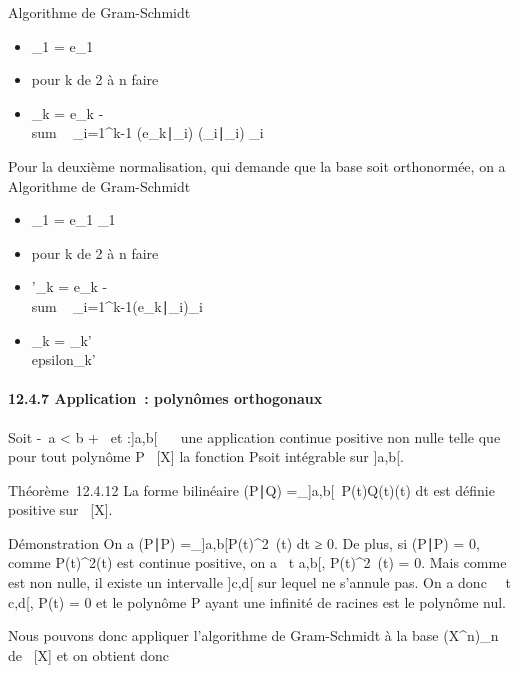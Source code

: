 \documentclass[]{article}
\begin{document}
Algorithme de Gram-Schmidt

\begin{itemize}
\itemsep1pt\parskip0pt
\item
  \epsilon_1 = e_1
\item
  pour k de 2 à n faire
\item
  \quad \quad \epsilon_k = e_k
  -\\sum ~
  _i=1^k-1
  (e_k∣\epsilon_i)
  \over
  (\epsilon_i∣\epsilon_i) \epsilon_i
\end{itemize}

Pour la deuxième normalisation, qui demande que la base soit
orthonormée, on a Algorithme de Gram-Schmidt

\begin{itemize}
\itemsep1pt\parskip0pt
\item
  \epsilon_1 = e_1\over
  \e_1\
\item
  pour k de 2 à n faire
\item
  \quad \quad \epsilon'_k = e_k
  -\\sum ~
  _i=1^k-1(e_k∣\epsilon_i)\epsilon_i
\item
  \quad \quad \epsilon_k =
  \epsilon_k'\over
  \\epsilon_k'\
\end{itemize}

\paragraph{12.4.7 Application~: polynômes orthogonaux}

Soit -\infty~\leq a \textless{} b \leq +\infty~ et \omega :{]}a,b{[}\rightarrow~ ~ une application
continue positive non nulle telle que pour tout polynôme P \in {}~{[}X{]} la
fonction P\omega soit intégrable sur {]}a,b{[}.

Théorème~12.4.12 La forme bilinéaire (P∣Q)
=\int  _{]}a,b{[}~P(t)Q(t)\omega(t) dt est
définie positive sur \mathbb{R}~{[}X{]}.

Démonstration On a (P∣P)
=\int  _{]}a,b{[}P(t)^2~\omega(t)
dt ≥ 0. De plus, si (P∣P) = 0, comme
P(t)^2\omega(t) est continue positive, on a
\forall~t \in{]}a,b{[}, P(t)^2~\omega(t) = 0. Mais
comme \omega est non nulle, il existe un intervalle {]}c,d{[} sur lequel \omega ne
s'annule pas. On a donc \forall~~t \in{]}c,d{[}, P(t) =
0 et le polynôme P ayant une infinité de racines est le polynôme nul.

Nous pouvons donc appliquer l'algorithme de Gram-Schmidt à la base
(X^n)_n\in{}~ de ~{[}X{]} et on obtient donc
\end{document}
